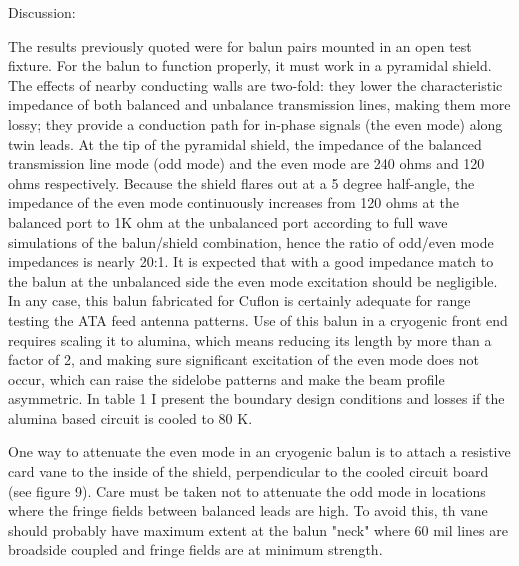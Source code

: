 Discussion:

The results previously quoted were for balun pairs mounted
in an open test fixture. For the balun to function properly, it must
work in a pyramidal shield. The effects of nearby conducting
walls are two-fold: they lower the characteristic impedance of both balanced
and unbalance transmission lines, making them more lossy;
they provide a conduction path 
for in-phase signals (the even mode) along twin leads.
At the tip of the pyramidal shield, the impedance of the balanced
transmission line mode (odd mode) and the even mode are 240 ohms
and 120 ohms respectively. Because the shield flares out at a 5 degree
half-angle, the impedance of the even mode continuously increases
from 120 ohms at the balanced port to 1K ohm at the unbalanced
port according to full wave simulations of the balun/shield combination,
hence the ratio of odd/even mode impedances is nearly 20:1. 
It is expected that with a good impedance match to the balun at
the unbalanced side the even mode excitation should be negligible.
In any case, this balun fabricated for Cuflon is certainly adequate for
range testing the ATA feed antenna patterns. Use of this balun
in a cryogenic front end requires scaling it to alumina, which means
reducing its length by more than a factor of 2, and making sure
significant excitation of the even mode does not occur, which can
raise the sidelobe patterns and make the beam profile asymmetric.
In table 1 I present the boundary design conditions and losses
if the alumina based circuit is cooled to 80 K.

One way to attenuate the even mode in an cryogenic balun is to attach 
a resistive card vane to the inside of the shield, perpendicular
to the cooled circuit board (see figure 9). Care must be taken not
to attenuate the odd mode in locations where the fringe fields
between balanced leads are high. To avoid this, th vane should probably 
have maximum extent at the balun "neck" where 60 mil lines are
broadside coupled and fringe fields are at minimum strength.  


